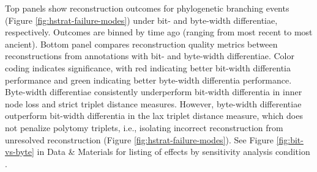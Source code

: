 \begin{figure*}
{  \footnotesize
   Top panels show reconstruction outcomes for phylogenetic branching events (Figure \ref{fig:hstrat-failure-modes}) under bit- and byte-width differentiae, respectively.
   Outcomes are binned by time ago (ranging from most recent to most ancient).
   Bottom panel compares reconstruction quality metrics between reconstructions from annotations with bit- and byte-width differentiae.
   Color coding indicates significance, with red indicating better bit-width differentia performance and green indicating better byte-width differentia performance.
   Byte-width differentiae consistently underperform bit-width differentia in inner node loss and strict triplet distance measures.
   However, byte-width differentiae outperform bit-width differentia in the lax triplet distance measure, which does not penalize polytomy triplets, i.e., isolating incorrect reconstruction from unresolved reconstruction (Figure \ref{fig:hstrat-failure-modes}).
  See Figure \ref{fig:bit-vs-byte} in Data \& Materials for listing of effects by sensitivity analysis condition \citep{moreno2024supplemental}.
}
  \label{fig:bit-vs-byte-summary}

\end{figure*}

